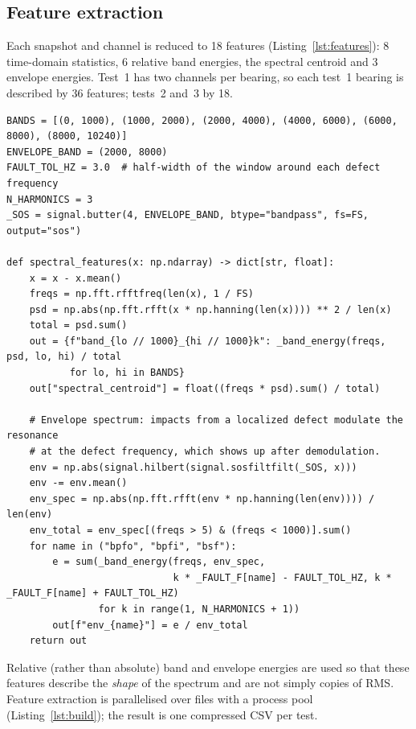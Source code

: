 \documentclass[11pt]{article}
\begin{document}
\subsection{Feature extraction}
Each snapshot and channel is reduced to 18 features (Listing~\ref{lst:features}): 8 time-domain
statistics, 6 relative band energies, the spectral centroid and 3 envelope energies. Test~1 has two
channels per bearing, so each test~1 bearing is described by 36 features; tests~2 and~3 by 18.

\begin{lstlisting}[caption={Spectral and envelope features (excerpt of \code{src/bearing\_efw/features.py}).},label=lst:features]
BANDS = [(0, 1000), (1000, 2000), (2000, 4000), (4000, 6000), (6000, 8000), (8000, 10240)]
ENVELOPE_BAND = (2000, 8000)
FAULT_TOL_HZ = 3.0  # half-width of the window around each defect frequency
N_HARMONICS = 3
_SOS = signal.butter(4, ENVELOPE_BAND, btype="bandpass", fs=FS, output="sos")

def spectral_features(x: np.ndarray) -> dict[str, float]:
    x = x - x.mean()
    freqs = np.fft.rfftfreq(len(x), 1 / FS)
    psd = np.abs(np.fft.rfft(x * np.hanning(len(x)))) ** 2 / len(x)
    total = psd.sum()
    out = {f"band_{lo // 1000}_{hi // 1000}k": _band_energy(freqs, psd, lo, hi) / total
           for lo, hi in BANDS}
    out["spectral_centroid"] = float((freqs * psd).sum() / total)

    # Envelope spectrum: impacts from a localized defect modulate the resonance
    # at the defect frequency, which shows up after demodulation.
    env = np.abs(signal.hilbert(signal.sosfiltfilt(_SOS, x)))
    env -= env.mean()
    env_spec = np.abs(np.fft.rfft(env * np.hanning(len(env)))) / len(env)
    env_total = env_spec[(freqs > 5) & (freqs < 1000)].sum()
    for name in ("bpfo", "bpfi", "bsf"):
        e = sum(_band_energy(freqs, env_spec,
                             k * _FAULT_F[name] - FAULT_TOL_HZ, k * _FAULT_F[name] + FAULT_TOL_HZ)
                for k in range(1, N_HARMONICS + 1))
        out[f"env_{name}"] = e / env_total
    return out
\end{lstlisting}

Relative (rather than absolute) band and envelope energies are used so that these features describe
the \emph{shape} of the spectrum and are not simply copies of RMS. Feature extraction is parallelised
over files with a process pool (Listing~\ref{lst:build}); the result is one compressed CSV per test.
\end{document}
